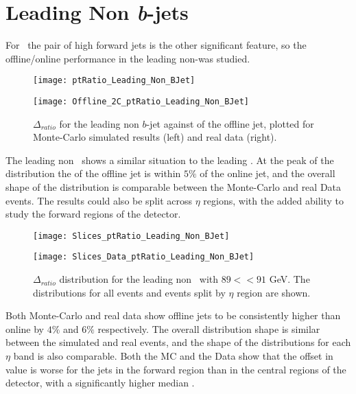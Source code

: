 \newpage
\section{Leading Non \textit{b}-jets}
	\label{OP:leadingnonb}

	For \VBFHBB\, the pair of high \pt forward jets is the other significant feature, so the offline/online performance in the leading non-\bjet was studied.

	\begin{figure}[h]
		\centering
		\begin{minipage}[h]{0.48\linewidth}
			\texttt{[image: ptRatio\_Leading\_Non\_BJet]}

		\end{minipage}
		\quad
		\begin{minipage}[h]{0.48\linewidth}
			\texttt{[image: Offline\_2C\_ptRatio\_Leading\_Non\_BJet]}
		\end{minipage}
		\caption{$\Delta $\pt$_{ratio}$ for the leading \pt non $b$-jet against \pt of the offline jet, plotted for Monte-Carlo simulated results (left) and real data (right).}
		\label{fig:O:leadingnonbpt}
	\end{figure}

	The leading non \bjet\, shows a similar situation to the leading \bjet. At the peak of the \dptpt distribution the \pt of the offline jet is within $5\%$ of the online jet, and the overall shape of the distribution is comparable between the Monte-Carlo and real Data events.
	The results could also be split across $\eta$ regions, with the added ability to study the forward regions of the detector.

	\begin{figure}[h]
		\centering

		\begin{minipage}[h]{0.48\linewidth}
			\texttt{[image: Slices\_ptRatio\_Leading\_Non\_BJet]}
		\end{minipage}
		\quad
		\begin{minipage}[h]{0.48\linewidth}
			\texttt{[image: Slices\_Data\_ptRatio\_Leading\_Non\_BJet]}
		\end{minipage}
		\caption{$\Delta $\pt$_{ratio}$ distribution for the leading non \bjet\, with $89<$\pt$<91$ GeV. The distributions for all events and events split by $\eta$ region are shown.}
		\label{fig:O:leadingnonbptslice}
	\end{figure}

	Both Monte-Carlo and real data show offline jets to be consistently higher \pt than online by $4\%$ and $6\%$ respectively. The overall distribution shape is similar between the simulated and real events, and the shape of the distributions for each $\eta$ band is also comparable. Both the MC and the Data show that the offset in \pt value is worse for the jets in the forward region than in the central regions of the detector, with a significantly higher median \dptpt.

